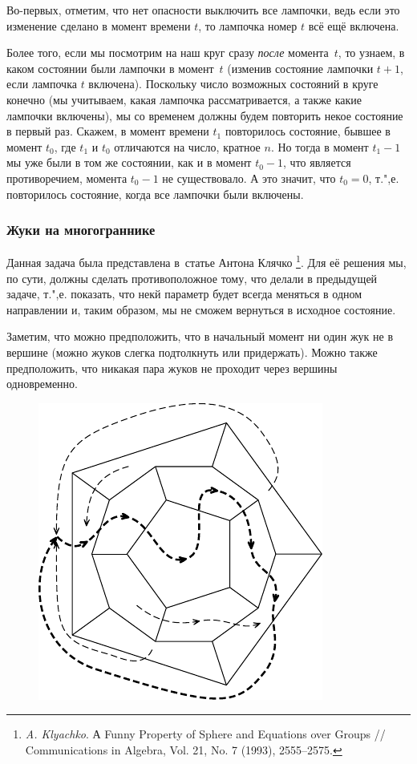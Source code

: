 \documentclass[twoside]{book}
\begin{document}
Во-первых, отметим, что нет опасности выключить все лампочки,
ведь если это изменение сделано в момент времени $t$, то лампочка номер $t$ всё ещё включена.

Более того, если мы посмотрим на наш круг сразу \emph{после} момента~$t$, то узнаем, в каком состоянии были лампочки в момент~$t$ (изменив состояние лампочки $t+1$, если лампочка $t$ включена).
Поскольку число возможных состояний в круге конечно (мы учитываем, какая лампочка рассматривается, а также какие лампочки включены),  мы со временем должны будем повторить некое состояние в первый раз.
Скажем, в момент времени $t_1$ повторилось состояние, бывшее в момент $t_0$, где $t_1$ и $t_0$ отличаются на число, кратное $n$.
Но тогда в момент $t_1 - 1$ мы уже были в том же состоянии, как и в момент $t_0 - 1$, что является противоречием,  момента $t_0 - 1$ не существовало.
А это значит, что $t_0=0$, т.",е. повторилось состояние, когда все лампочки были включены.
\heart

\subsubsection*{Жуки на многограннике}%

Данная задача была представлена в~статье Антона Клячко%
\footnote{\emph{A. Klyachko}. А Funny Property of Sphere and Equations over Groups /\!/ {Com\-mu\-ni\-ca\-tions in Algebra}, Vol. 21, No. 7 (1993), 2555--2575.}. 
Для её решения мы, по сути, должны сделать противоположное тому, что делали в предыдущей задаче, т.",е. показать, что некй параметр будет всегда меняться в одном направлении и, таким образом, мы не сможем вернуться в исходное состояние.


Заметим, что можно предположить, что в начальный момент ни один жук не  в вершине (можно жуков слегка подтолкнуть или придержать).
Можно также предположить, что никакая пара жуков не проходит через вершины одновременно.

\begin{figure}[!ht]
\centering
\includegraphics{mp/wink-22}
\end{figure}
\end{document}
